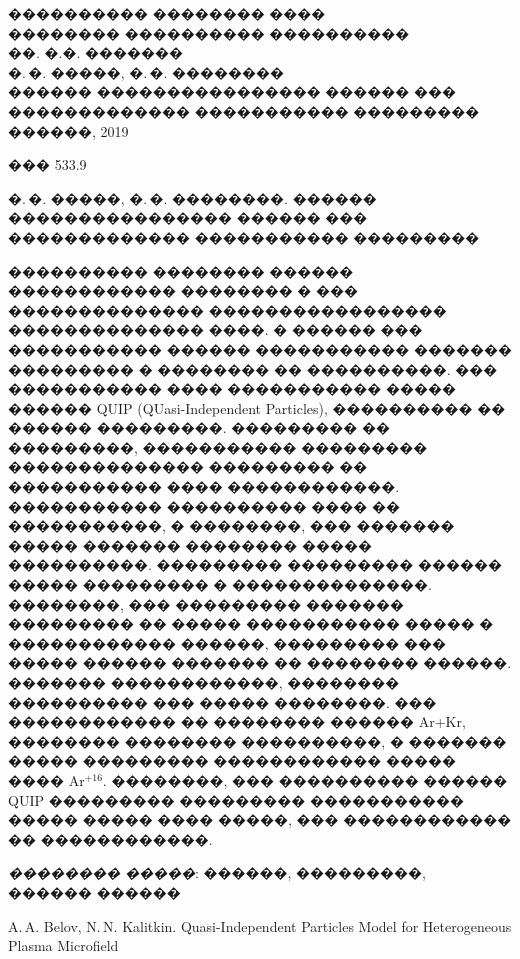 \documentclass[12pt,titlepage]{article}
\begin{document}
\begin{titlepage}
    \begin{center}
        {\LARGE
        ���������� �������� ����\\
        �������� ���������� ���������� \\
        ��. �.�. ������� \\
        \vskip4cm
        �.\,�. �����, �.\,�. ��������\\
        \vskip2cm
        ������ ���������������� ������ ��� ������������� ����������� ���������
        \vskip10cm
        ������, 2019}
    \end{center}
\end{titlepage}

\fontsize{14}{14pt}\selectfont

\thispagestyle{empty}
\noindent
��� 533.9

\bigskip

�.\,�. �����, �.\,�. ��������. ������ ���������������� ������ ��� ������������� ����������� ���������

\bigskip

���������� �������� ������ ������������ �������� � ��� �������������� ����������������� �������������� ����. � ������ ��� ����������� ������ ����������� ������� ��������� � �������� �� ����������. ��� ����������� ���� ����������� ����� ������ QUIP (QUasi-Independent Particles), ���������� �� ������ ���������. ��������� �� ���������, ����������� ��������� �������������� ��������� �� ����������� ���� ������������. ����������� ���������� ���� �� �����������, � ��������, ��� ������� ����� ������� �������� ����� ����������. ��������� ��������� ������ ����� ��������� � ��������������. ��������, ��� ��������� ������� ��������� �� ����� ����������� ����� � ������������ ������, ��������� ��� ����� ������ ������� �� �������� ������. ������� ������������, �������� ���������� ��� ����� ��������. ��� ������������ �� �������� ������ Ar+Kr, �������� �������� ����������, � ������� ����� ��������� ������������ ����� ���� Ar$^{+16}$. ��������, ��� ���������� ������ QUIP ��������� ��������� ����������� ����� ����� ���� �����, ��� ������������ �� ������������.

\medskip

\noindent \textit{�������� �����}: ������, ���������, ������ ������

\medskip

A.\,A. Belov, N.\,N. Kalitkin. Quasi-Independent Particles Model for Heterogeneous Plasma Microfield
\end{document}

